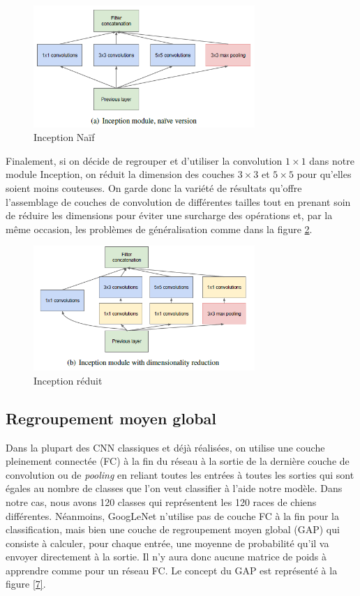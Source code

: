 \documentclass{article}
\begin{document}
\begin{figure}[htbp]
    \includegraphics[width=8.4cm]{./figures/Figure5.png} 
    \caption{Inception Naïf}
    \label{5} 
\end{figure} 

Finalement, si on décide de regrouper et d’utiliser la convolution $1\times 1$
dans notre module Inception, on réduit la dimension des couches $3\times 3$
et $5\times 5$ pour qu’elles soient moins couteuses. On garde donc la variété
de résultats qu’offre l’assemblage de couches de convolution de différentes
tailles tout en prenant soin de réduire les dimensions pour éviter une surcharge
des opérations et, par la même occasion, les problèmes de généralisation comme
dans la figure \ref{6}. ~\cite{43022}

\begin{figure}[htbp]
    \includegraphics[width=8.4cm]{./figures/Figure6.png} 
    \caption{Inception réduit}
    \label{6} 
\end{figure} 

\subsection{Regroupement moyen global}
Dans la plupart des CNN classiques et déjà réalisées, on utilise une couche
pleinement connectée (FC) à la fin du réseau à la sortie de la dernière couche
de convolution ou de \textit{pooling} en reliant toutes les entrées à toutes les
sorties qui sont égales au nombre de classes que l’on veut classifier à l’aide
notre modèle. Dans notre cas, nous avons 120 classes qui représentent les 120
races de chiens différentes. Néanmoins, GoogLeNet n’utilise pas de couche FC à
la fin pour la classification, mais bien une couche de regroupement moyen global
(GAP) qui consiste à calculer, pour chaque entrée, une moyenne de probabilité
qu’il va envoyer directement à la sortie. Il n’y aura donc aucune matrice de
poids à apprendre comme pour un réseau FC. Le concept du GAP est représenté à la
figure \ref{7}. ~\cite{tsang_2018}
\end{document}
